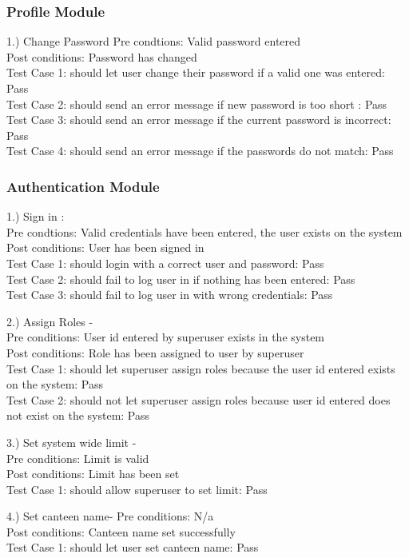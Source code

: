 \documentclass[a4paper,12pt]{article}
\begin{document}
\subsubsection{Profile Module}
1.) Change Password
Pre condtions: Valid password entered
\\Post conditions: Password has changed
\\ Test Case 1: should let user change their password if a valid one was entered: Pass
\\ Test Case 2: should send an error message if new password is too short : Pass
\\ Test Case 3: should send an error message if the current password is incorrect: Pass
\\ Test Case 4: should send an error message if the passwords do not match: Pass
 
\subsubsection{Authentication Module}
1.) Sign in : \\
Pre condtions: Valid credentials have been entered, the user exists on the system
\\ Post conditions: User has been signed in
\\  Test Case 1: should login with a correct user and password: Pass
\\ Test Case 2: should fail to log user in if nothing has been entered: Pass
\\ Test Case 3: should fail to log user in with wrong credentials: Pass

2.) Assign Roles - \\
Pre conditions: User id entered by superuser exists in the system \\
Post conditions: Role has been assigned to user by superuser \\
Test Case 1:  should let superuser assign roles because the user id entered exists on the system: Pass
\\ Test Case 2:  should not let superuser assign roles because user id entered does not exist on the system: Pass
 
3.) Set system wide limit - \\
Pre conditions: Limit is valid \\
Post conditions: Limit has been set \\
Test Case 1: should allow superuser to set limit: Pass

4.) Set canteen name-
Pre conditions: N/a \\
Post conditions: Canteen name set successfully \\
Test Case 1: should let user set canteen name: Pass
\end{document}
